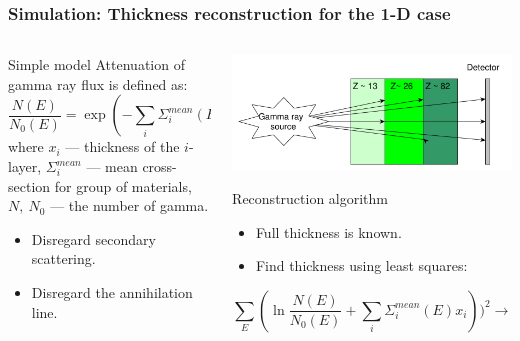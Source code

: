 \documentclass[11pt]{beamer}
\begin{document}
    \begin{frame}
    \frametitle{Simulation: Thickness reconstruction for the 1-D case}
    \begin{columns}
        \begin{column}{0.4\textwidth}
            \begin{block}{Simple model}
                Attenuation of gamma ray flux is defined as:
                                        $$
                \frac{N(E)}{N_0(E)} = \exp(-\sum_i \Sigma^{mean}_i(E)x_i)
                $$
                where $x_i$ --- thickness of the $i$-layer, $\Sigma^{mean}_i$ --- mean cross-section for group of materials, $N,~N_0$ --- the number of gamma.
                \begin{itemize}
                    \item Disregard secondary scattering.
                    \item Disregard the annihilation line.
                \end{itemize}

                   
            \end{block}

        \end{column}
        \begin{column}{0.55\textwidth}
                  \includegraphics[width=1\textwidth]{figures/yed_schema_2.pdf}
                \begin{block}{Reconstruction algorithm}
                    \begin{itemize}
                        \item Full thickness is known.
                        \item Find thickness using least squares:                  
                        
                    \end{itemize}
                    $$
                    \sum_E(\ln \frac{N(E)}{N_0(E)} + \sum_i \Sigma^{mean}_i(E)x_i))^2 \to min
                    $$
                \end{block}


        \end{column}
    \end{columns}  
\end{frame}
\end{document}
